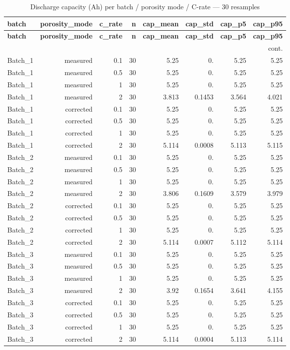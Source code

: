 \documentclass[11pt,a4paper]{article}
\begin{document}
\begin{longtable}{lrrrrrrr}
\caption{Discharge capacity (Ah) per batch / porosity mode / C-rate --- 30 resamples}\label{tab:dfncap}\\
\toprule
\textbf{batch} & \textbf{porosity\_mode} & \textbf{c\_rate} & \textbf{n} & \textbf{cap\_mean} & \textbf{cap\_std} & \textbf{cap\_p5} & \textbf{cap\_p95} \\
\midrule
\endfirsthead
\toprule \textbf{batch} & \textbf{porosity\_mode} & \textbf{c\_rate} & \textbf{n} & \textbf{cap\_mean} & \textbf{cap\_std} & \textbf{cap\_p5} & \textbf{cap\_p95} \\
\midrule
\endhead
\midrule\multicolumn{8}{r}{\footnotesize cont.}\\\midrule\endfoot
\bottomrule\endlastfoot
Batch\_1 & measured & 0.1 & 30 & 5.25 & 0. & 5.25 & 5.25 \\
Batch\_1 & measured & 0.5 & 30 & 5.25 & 0. & 5.25 & 5.25 \\
Batch\_1 & measured & 1 & 30 & 5.25 & 0. & 5.25 & 5.25 \\
Batch\_1 & measured & 2 & 30 & 3.813 & 0.1453 & 3.564 & 4.021 \\
Batch\_1 & corrected & 0.1 & 30 & 5.25 & 0. & 5.25 & 5.25 \\
Batch\_1 & corrected & 0.5 & 30 & 5.25 & 0. & 5.25 & 5.25 \\
Batch\_1 & corrected & 1 & 30 & 5.25 & 0. & 5.25 & 5.25 \\
Batch\_1 & corrected & 2 & 30 & 5.114 & 0.0008 & 5.113 & 5.115 \\
Batch\_2 & measured & 0.1 & 30 & 5.25 & 0. & 5.25 & 5.25 \\
Batch\_2 & measured & 0.5 & 30 & 5.25 & 0. & 5.25 & 5.25 \\
Batch\_2 & measured & 1 & 30 & 5.25 & 0. & 5.25 & 5.25 \\
Batch\_2 & measured & 2 & 30 & 3.806 & 0.1609 & 3.579 & 3.979 \\
Batch\_2 & corrected & 0.1 & 30 & 5.25 & 0. & 5.25 & 5.25 \\
Batch\_2 & corrected & 0.5 & 30 & 5.25 & 0. & 5.25 & 5.25 \\
Batch\_2 & corrected & 1 & 30 & 5.25 & 0. & 5.25 & 5.25 \\
Batch\_2 & corrected & 2 & 30 & 5.114 & 0.0007 & 5.112 & 5.114 \\
Batch\_3 & measured & 0.1 & 30 & 5.25 & 0. & 5.25 & 5.25 \\
Batch\_3 & measured & 0.5 & 30 & 5.25 & 0. & 5.25 & 5.25 \\
Batch\_3 & measured & 1 & 30 & 5.25 & 0. & 5.25 & 5.25 \\
Batch\_3 & measured & 2 & 30 & 3.92 & 0.1654 & 3.641 & 4.155 \\
Batch\_3 & corrected & 0.1 & 30 & 5.25 & 0. & 5.25 & 5.25 \\
Batch\_3 & corrected & 0.5 & 30 & 5.25 & 0. & 5.25 & 5.25 \\
Batch\_3 & corrected & 1 & 30 & 5.25 & 0. & 5.25 & 5.25 \\
Batch\_3 & corrected & 2 & 30 & 5.114 & 0.0004 & 5.113 & 5.114 \\
\end{longtable}
\end{document}
